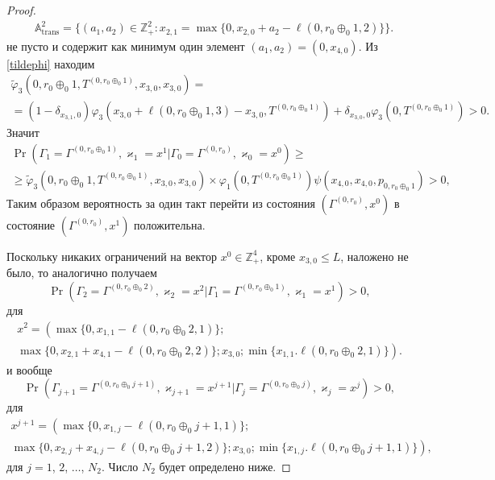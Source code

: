 \documentclass[a4paper,12pt,russian]{extarticle}
\begin{document}
\begin{proof}
\begin{align*}
 &{\mathbb A}_{\mathrm{trans}}^2= \{(a_1,a_2) \in \mathbb{Z}_+^2 \colon  x_{2,1}=\max{\{0,x_{2,0}+a_2-\ell(0,r_0\oplus_{0}1,2)\}}\}.
\end{align*}
не пусто и содержит как минимум один элемент $(a_1,a_2)=(0,x_{4,0})$. Из \eqref{tildephi} находим
\begin{multline*}
\widetilde{\varphi}_3(0,r_0\oplus_{0}1,T^{(0,r_0\oplus_{0}1)},x_{3,0},x_{3,0}) =\\ = (1-\delta_{x_{3,1},0}) \varphi_3(x_{3,0} + \ell (0,r_0\oplus_{0}1,3) - x_{3,0},T^{(0,r_0\oplus_{0}1)} )
+\delta_{x_{3,0},0} \varphi_3 (0,T^{(0,r_0\oplus_{0}1)}) > 0.
\end{multline*}
Значит
\begin{multline*}
\Pr (\Gamma_{1}=\Gamma^{(0,r_0\oplus_{0}1)},\varkappa_{1}=x^1 | \Gamma_{0}=\Gamma^{(0,r_0)},\varkappa_0=x^0)\geqslant \\
\geqslant \widetilde{\varphi}_3(0,r_0\oplus_{0}1,T^{(0,r_0\oplus_{0}1)},x_{3,0},x_{3,0})
\times
\varphi_1(0,T^{(0,r_0\oplus_{0}1)})  \psi(x_{4,0},x_{4,0}, p_{0,r_0\oplus_{0}1}) > 0,
\end{multline*}
Таким образом вероятность за один такт перейти из состояния $(\Gamma^{(0,r_0)}, x^0)$ в состояние $ (\Gamma^{(0,r_0)}, x^1)$ положительна.

Поскольку никаких ограничений на вектор $x^0 \in \mathbb{Z}_+^4$, кроме $x_{3,0}\leqslant L$, наложено не было, то аналогично получаем
\begin{equation*}
\Pr (\Gamma_{2}=\Gamma^{(0,r_0\oplus_{0}2)},\varkappa_{2}=x^2 | \Gamma_{1}=\Gamma^{(0,r_0\oplus_{0}1)},\varkappa_1=x^1) > 0,
\end{equation*}
для 
\begin{multline*}
x^2  =\left(\max{\{0, x_{1,1} - \ell(0,r_0\oplus_{0}2,1)\}}; \right. \\
\left. \max{\{0, x_{2,1} + x_{4,1}  - \ell(0,r_0\oplus_{0}2,2)\}}; x_{3,0};\min{\{x_{1,1}. \ell(0,r_0\oplus_{0}2,1)\}}\right).
\end{multline*}
и вообще 
\begin{equation*}
\Pr (\Gamma_{j+1}=\Gamma^{(0,r_0\oplus_{0}j+1)},\varkappa_{j+1}=x^{j+1} | \Gamma_{j}=\Gamma^{(0,r_0\oplus_{0}j)},\varkappa_j=x^j) > 0,
\end{equation*}
для 
\begin{multline*}
x^{j+1}  =\left(\max{\{0, x_{1,j} - \ell(0,r_0\oplus_{0}j+1,1)\}}; \right. \\
\left. \max{\{0, x_{2,j} + x_{4,j}  - \ell(0,r_0\oplus_{0}j+1,2)\}}; x_{3,0};\min{\{x_{1,j}. \ell(0,r_0\oplus_{0}j+1,1)\}}\right),
\end{multline*}
для $j = 1$, $2$, $\ldots$, $N_2$. Число $N_2$ будет определено ниже.


\end{proof}
\end{document}
